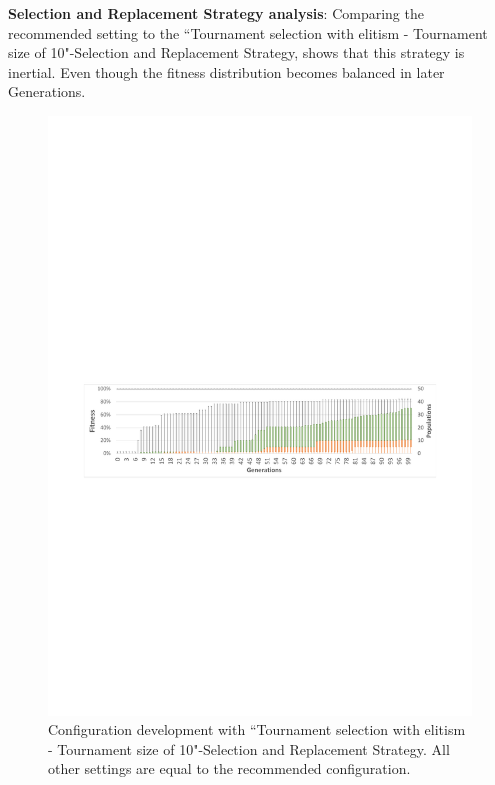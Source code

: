 
\textbf{Selection and Replacement Strategy analysis}: Comparing the recommended setting to the ``Tournament selection with elitism - Tournament size of 10"-Selection and Replacement Strategy, shows that this strategy is inertial. Even though the fitness distribution becomes balanced in later \glspl{Generation}.

\begin{figure}[!ht]
	\centering
	\includegraphics[scale=0.8, trim=1.5cm 11.5cm 1.5cm 13cm, clip=true]{Images/ConfigurationComparison_TournamentSize10.pdf} 
	\caption{Configuration development with ``Tournament selection with elitism - Tournament size of 10"-Selection and Replacement Strategy. All other settings are equal to the recommended configuration.}
	\label{figConfigurationComparison_TournamentSize10}
\end{figure}

